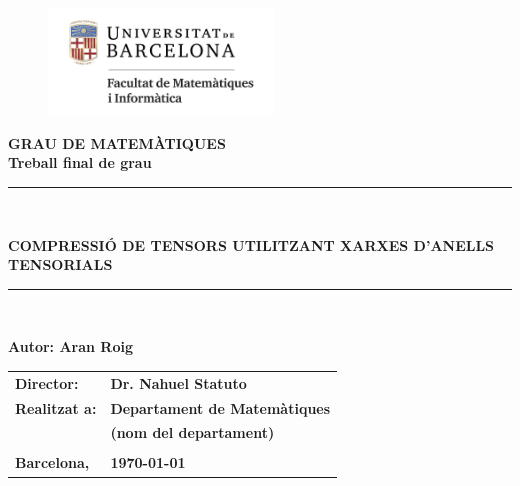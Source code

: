 \documentclass[11pt,a4paper,openright,oneside]{article}
\numberwithin{equation}{section}
\theoremstyle{definition}
\begin{document}

\thispagestyle{empty}

\begin{titlepage}
\begin{center}
\begin{figure}[htb]
\begin{center}
\includegraphics[width=6cm]{refname.jpg}
\end{center}
\end{figure}

\vspace*{1cm}
\textbf{\LARGE GRAU DE MATEMÀTIQUES } \\
\vspace*{.5cm}
\textbf{\LARGE Treball final de grau} \\

\vspace*{1.5cm}
\rule{16cm}{0.1mm}\\
\begin{Huge}
\textbf{COMPRESSIÓ DE TENSORS UTILITZANT XARXES D'ANELLS TENSORIALS} \\
\end{Huge}
\rule{16cm}{0.1mm}\\

\vspace{1cm}

\begin{flushright}
\textbf{\LARGE Autor: Aran Roig}

\vspace*{2cm}

\renewcommand{\arraystretch}{1.5}
\begin{tabular}{ll}
\textbf{\Large Director:} & \textbf{\Large Dr. Nahuel Statuto } \\
\textbf{\Large Realitzat a:} & \textbf{\Large  Departament de Matemàtiques   } \\
 & \textbf{\Large (nom del departament)} \\
\\
\textbf{\Large Barcelona,} & \textbf{\Large \today }
\end{tabular}

\end{flushright}

\end{center}
\end{titlepage}
\end{document}
